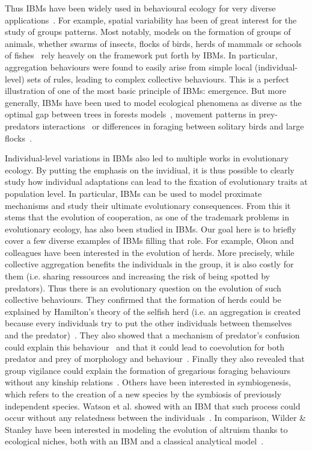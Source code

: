         Thus IBMs have been widely used in behavioural ecology for very diverse applications~\parencite{DeAngelis2005}. For example, spatial variability has been of great interest for the study of groups patterns. Most notably, models on the formation of groups of animals, whether swarms of insects, flocks of birds, herds of mammals or schools of fishes~\parencite{Huth1992, Reynolds1992, Gueron1996, Couzin2002} rely heavely on the framework put forth by IBMs. In particular, aggregation behaviours were found to easily arise from simple local (individual-level) sets of rules, leading to complex collective behaviours. This is a perfect illustration of one of the most basic principle of IBMs: emergence. But more generally, IBMs have been used to model ecological phenomena as diverse as the optimal gap between trees in forests models~\parencite{Botkin1972}, movement patterns in prey-predators interactions~\parencite{Smith1991} or differences in foraging between solitary birds and large flocks~\parencite{Toquenaga1995}.

        Individual-level variations in IBMs also led to multiple works in evolutionary ecology. By putting the emphasis on the invidiual, it is thus possible to clearly study how individual adaptations can lead to the fixation of evolutionary traits at population level. In particular, IBMs can be used to model proximate mechanisms and study their ultimate evolutionary consequences. From this it stems that the evolution of cooperation, as one of the trademark problems in evolutionary ecology, has also been studied in IBMs. Our goal here is to briefly cover a few diverse examples of IBMs filling that role. For example, Olson and colleagues have been interested in the evolution of herds. More precisely, while collective aggregation benefits the individuals in the group, it is also costly for them (i.e. sharing ressources and increasing the risk of being spotted by predators). Thus there is an evolutionary question on the evolution of such collective behaviours. They confirmed that the formation of herds could be explained by Hamilton's theory of the selfish herd (i.e. an aggregation is created because every individuals try to put the other individuals between themselves and the predator)~\parencite{Hamilton1971, Olson2013a}. They also showed that a mechanism of predator's confusion could explain this behaviour~\parencite{Olson2013} and that it could lead to coevolution for both predator and prey of morphology and behaviour~\parencite{Olson2016}. Finally they also revealed that group vigilance could explain the formation of gregarious foraging behaviours without any kinship relations~\parencite{Haley2014, Olson2014a}. Others have been interested in symbiogenesis, which refers to the creation of a new species by the symbiosis of previously independent species. Watson et al. showed with an IBM that such process could occur without any relatedness between the individuals~\parencite{Watson1992}. In comparison, Wilder \& Stanley have been interested in modeling the evolution of altruism thanks to ecological niches, both with an IBM and a classical analytical model~\parencite{Wilder2015}.

